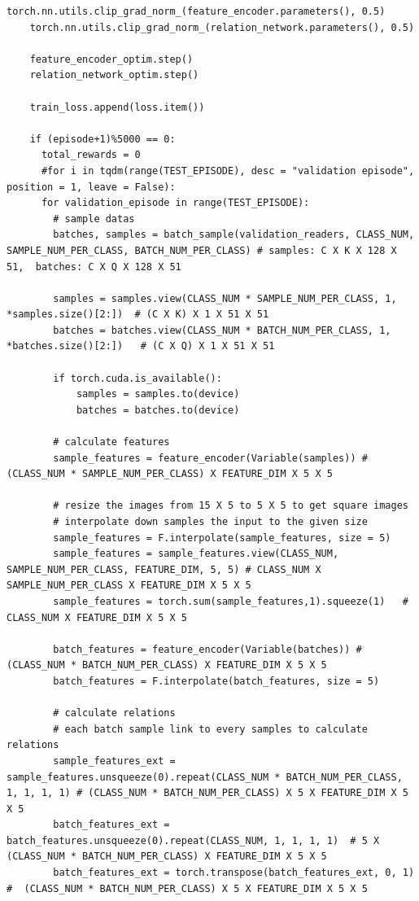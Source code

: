 \documentclass[12pt,a4paper,titlepage]{article}
\begin{document}
\begin{lstlisting}[language=iPython,firstnumber=1, caption=relation\_training.py, label=relation training,captionpos=b]
    torch.nn.utils.clip_grad_norm_(feature_encoder.parameters(), 0.5)
    torch.nn.utils.clip_grad_norm_(relation_network.parameters(), 0.5)

    feature_encoder_optim.step()
    relation_network_optim.step()

    train_loss.append(loss.item())

    if (episode+1)%5000 == 0:
      total_rewards = 0
      #for i in tqdm(range(TEST_EPISODE), desc = "validation episode", position = 1, leave = False):
      for validation_episode in range(TEST_EPISODE):
        # sample datas
        batches, samples = batch_sample(validation_readers, CLASS_NUM, SAMPLE_NUM_PER_CLASS, BATCH_NUM_PER_CLASS) # samples: C X K X 128 X 51,  batches: C X Q X 128 X 51
        
        samples = samples.view(CLASS_NUM * SAMPLE_NUM_PER_CLASS, 1, *samples.size()[2:])  # (C X K) X 1 X 51 X 51
        batches = batches.view(CLASS_NUM * BATCH_NUM_PER_CLASS, 1, *batches.size()[2:])   # (C X Q) X 1 X 51 X 51

        if torch.cuda.is_available():
            samples = samples.to(device)
            batches = batches.to(device)

        # calculate features
        sample_features = feature_encoder(Variable(samples)) # (CLASS_NUM * SAMPLE_NUM_PER_CLASS) X FEATURE_DIM X 5 X 5

        # resize the images from 15 X 5 to 5 X 5 to get square images
        # interpolate down samples the input to the given size
        sample_features = F.interpolate(sample_features, size = 5)
        sample_features = sample_features.view(CLASS_NUM, SAMPLE_NUM_PER_CLASS, FEATURE_DIM, 5, 5) # CLASS_NUM X SAMPLE_NUM_PER_CLASS X FEATURE_DIM X 5 X 5
        sample_features = torch.sum(sample_features,1).squeeze(1)   # CLASS_NUM X FEATURE_DIM X 5 X 5

        batch_features = feature_encoder(Variable(batches)) # (CLASS_NUM * BATCH_NUM_PER_CLASS) X FEATURE_DIM X 5 X 5
        batch_features = F.interpolate(batch_features, size = 5)

        # calculate relations
        # each batch sample link to every samples to calculate relations
        sample_features_ext = sample_features.unsqueeze(0).repeat(CLASS_NUM * BATCH_NUM_PER_CLASS, 1, 1, 1, 1) # (CLASS_NUM * BATCH_NUM_PER_CLASS) X 5 X FEATURE_DIM X 5 X 5
        batch_features_ext = batch_features.unsqueeze(0).repeat(CLASS_NUM, 1, 1, 1, 1)  # 5 X (CLASS_NUM * BATCH_NUM_PER_CLASS) X FEATURE_DIM X 5 X 5
        batch_features_ext = torch.transpose(batch_features_ext, 0, 1)  #  (CLASS_NUM * BATCH_NUM_PER_CLASS) X 5 X FEATURE_DIM X 5 X 5


\end{lstlisting}
\end{document}
